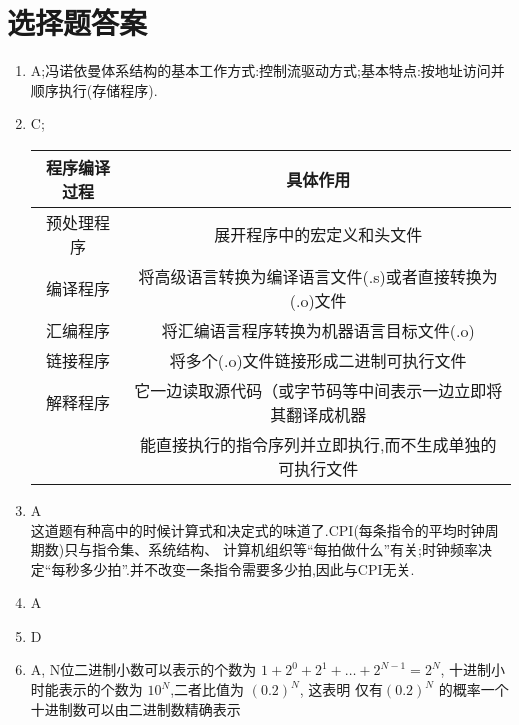 \documentclass[12pt, a4paper, oneside, UTF8]{ctexbook}
\begin{document}
\section{选择题答案}
\begin{enumerate}[label=\arabic*.\textbf{答案}:]
\item A;冯诺依曼体系结构的基本工作方式:控制流驱动方式;基本特点:按地址访问并顺序执行(存储程序). 
\item C;
\begin{center}
\begin{tabular}{c|c}
    \hline 
    程序编译过程 & 具体作用 \\ 
    \hline 
    预处理程序 & 展开程序中的宏定义和头文件  \\
    \hline 
    编译程序 & 将高级语言转换为编译语言文件(.s)或者直接转换为(.o)文件 \\
    \hline 
    汇编程序 & 将汇编语言程序转换为机器语言目标文件(.o) \\
    \hline 
    链接程序 & 将多个(.o)文件链接形成二进制可执行文件 \\
    \hline  
    解释程序 & 它一边读取源代码（或字节码等中间表示一边立即将其翻译成机器 \\
    {}     &  能直接执行的指令序列并立即执行,而不生成单独的可执行文件 \\
    \hline 
\end{tabular}
\end{center}
\item A \\
这道题有种高中的时候计算式和决定式的味道了.CPI(每条指令的平均时钟周期数)只与指令集、系统结构、
计算机组织等“每拍做什么”有关;时钟频率决定“每秒多少拍”.并不改变一条指令需要多少拍,因此与CPI无关. 

\item A 
\item D
\item A, N位二进制小数可以表示的个数为 $1+2^0+2^1+\ldots+2^{N-1}=2^N$, 十进制小时能表示的个数为 $10^N$,二者比值为
$(0.2)^N$, 这表明{\color{red} 仅有$(0.2)^N$ 的概率一个十进制数可以由二进制数精确表示} 


\end{enumerate}
\end{document}
